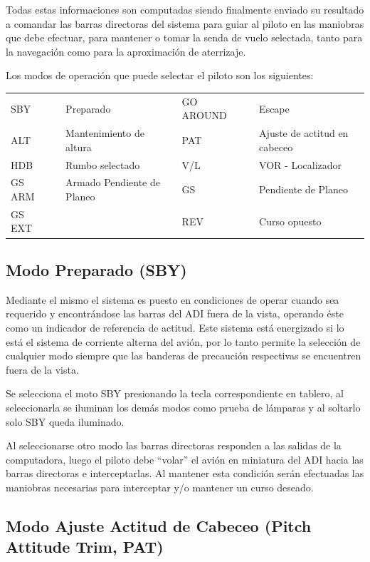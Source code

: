 \documentclass[a4paper,12pt,twoside]{article}
\begin{document}
Todas estas informaciones son computadas siendo finalmente enviado su
resultado a comandar las barras directoras del sistema para guiar al
piloto en las maniobras que debe efectuar, para mantener o tomar la
senda de vuelo selectada, tanto para la navegaci\'on como para la
aproximaci\'on de aterrizaje.

Los modos de operaci\'on que puede selectar el piloto son los siguientes:

  \begin{tabular}{lm{3mm}llm{3mm}l}
\rowcolor{cyan!10}
    	SBY &  & Preparado &
	GO AROUND &  & Escape \\
\rowcolor{yellow!10}
	ALT &  & Mantenimiento de altura    &
	PAT &  & Ajuste de actitud en cabeceo \\
\rowcolor{cyan!10}
	HDB &  & Rumbo selectado &
	V/L &  & VOR - Localizador \\
\rowcolor{yellow!10}
        GS ARM & & Armado Pendiente de Planeo &
	GS & & Pendiente de Planeo \\
\rowcolor{cyan!10}
	GS EXT & &  &
	REV & & Curso opuesto \\
  \end{tabular}

\subsection{Modo Preparado (SBY)}
\label{sec:modo.sby}
Mediante el mismo el sistema es puesto en condiciones de operar cuando sea
requerido y encontr\'andose las barras del ADI fuera de la vista,
operando \'este como un indicador de referencia de actitud.
Este sistema est\'a energizado si lo est\'a el sistema de corriente
alterna del avi\'on, por lo tanto permite la selecci\'on de cualquier modo siempre que las banderas de precauci\'on respectivas se encuentren fuera de la
vista.

Se selecciona el moto SBY presionando la tecla correspondiente
en tablero, al seleccionarla se iluminan los dem\'as modos
como prueba de l\'amparas y al soltarlo solo SBY queda iluminado.

Al seleccionarse otro modo las barras directoras responden a las salidas
de la computadora, luego el piloto debe ``volar'' el avi\'on en miniatura
del ADI hacia las barras directoras e interceptarlas. Al mantener esta
condici\'on ser\'an efectuadas las maniobras necesarias para interceptar
y/o mantener un curso deseado.

\subsection{Modo Ajuste Actitud de Cabeceo (Pitch Attitude Trim, PAT)}
\label{sec:modo.ajuste.pitch}
\end{document}
